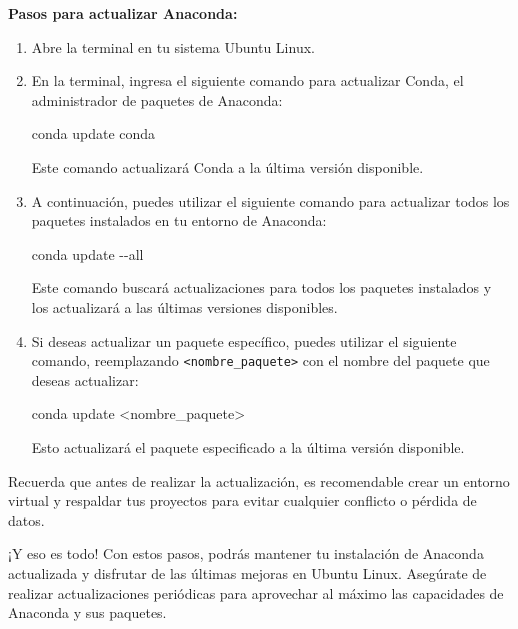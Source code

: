 \documentclass[
  jou,
  floatsintext,
  longtable,
  a4paper,
  nolmodern,
  notxfonts,
  notimes,
  colorlinks=true,linkcolor=blue,citecolor=blue,urlcolor=blue]{apa7}
\newenvironment{Shaded}{\begin{snugshade}}{\end{snugshade}}
\newcommand{\AttributeTok}[1]{\textcolor[rgb]{0.40,0.45,0.13}{#1}}
\newcommand{\ExtensionTok}[1]{\textcolor[rgb]{0.00,0.23,0.31}{#1}}
\newcommand{\NormalTok}[1]{\textcolor[rgb]{0.00,0.23,0.31}{#1}}
\newcommand{\OperatorTok}[1]{\textcolor[rgb]{0.37,0.37,0.37}{#1}}
\begin{document}
\textbf{Pasos para actualizar Anaconda:}

\begin{enumerate}
\def\labelenumi{\arabic{enumi}.}
\item
  Abre la terminal en tu sistema Ubuntu Linux.
\item
  En la terminal, ingresa el siguiente comando para actualizar Conda, el
  administrador de paquetes de Anaconda:

\begin{Shaded}
\begin{Highlighting}[]
\ExtensionTok{conda}\NormalTok{ update conda}
\end{Highlighting}
\end{Shaded}

  Este comando actualizará Conda a la última versión disponible.
\item
  A continuación, puedes utilizar el siguiente comando para actualizar
  todos los paquetes instalados en tu entorno de Anaconda:

\begin{Shaded}
\begin{Highlighting}[]
\ExtensionTok{conda}\NormalTok{ update }\AttributeTok{{-}{-}all}
\end{Highlighting}
\end{Shaded}

  Este comando buscará actualizaciones para todos los paquetes
  instalados y los actualizará a las últimas versiones disponibles.
\item
  Si deseas actualizar un paquete específico, puedes utilizar el
  siguiente comando, reemplazando
  \texttt{\textless{}nombre\_paquete\textgreater{}} con el nombre del
  paquete que deseas actualizar:

\begin{Shaded}
\begin{Highlighting}[]
\ExtensionTok{conda}\NormalTok{ update }\OperatorTok{\textless{}}\NormalTok{nombre\_paquete}\OperatorTok{\textgreater{}}
\end{Highlighting}
\end{Shaded}

  Esto actualizará el paquete especificado a la última versión
  disponible.
\end{enumerate}

Recuerda que antes de realizar la actualización, es recomendable crear
un entorno virtual y respaldar tus proyectos para evitar cualquier
conflicto o pérdida de datos.

¡Y eso es todo! Con estos pasos, podrás mantener tu instalación de
Anaconda actualizada y disfrutar de las últimas mejoras en Ubuntu Linux.
Asegúrate de realizar actualizaciones periódicas para aprovechar al
máximo las capacidades de Anaconda y sus paquetes.
\end{document}
